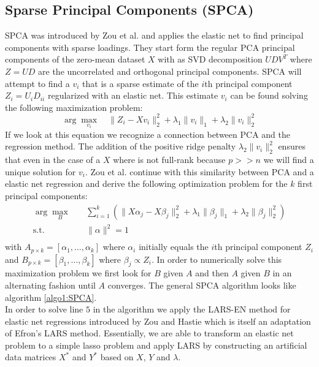 \documentclass[11pt,letterpaper]{report}
\begin{document}
\subsection*{Sparse Principal Components (SPCA)}
SPCA was introduced by Zou et al. \cite{Zou2006} and applies the elastic net to find principal components with sparse loadings. They start form the regular PCA principal components of the zero-mean dataset $X$ with as SVD decomposition $UDV^T$ where $Z=UD$ are the uncorrelated and orthogonal principal components. SPCA will attempt to find a $v_i$ that is a sparse estimate of the $i$th principal component $Z_i = U_iD_{ii}$ regularized with an elastic net. This estimate $v_i$ can be found solving the following maximization problem:
\begin{equation*}
\arg\max_{v_{i}} \quad \|Z_i - X v_i\|_2^2 + \lambda_1\|v_i\|_1 + \lambda_2\|v_i\|_2^2
\end{equation*}
If we look at this equation we recognize a connection between PCA and the regression method. The addition of the positive ridge penalty $\lambda_2\|v_i\|_2^2$ ensures that even in the case of a $X$ where is not full-rank because $p>>n$ we will find a unique solution for $v_i$. Zou et al. continue with this similarity between PCA and a elastic net regression and derive the following optimization problem for the $k$ first principal components:
\begin{equation*}
\begin{aligned}
\arg\max_{B} \quad & \sum_{i=1}^{k} \left(\|X\alpha_j-X\beta_j\|_2^2 +\lambda_1 \|\beta_j\|_1 + \lambda_2\|\beta_j\|_2^2\right)\\
\textrm{s.t.} \quad & \|\alpha\|^2 = 1\\
\end{aligned}
\end{equation*}
with $A_{p\times k} = [\alpha_1,\ldots,\alpha_k]$ where $\alpha_i$ initially equals the $i$th principal component $Z_i$ and $B_{p\times k} = [\beta_1,\ldots,\beta_k]$ where $\beta_j\propto Z_i$. In order to numerically solve this maximization problem we first look for $B$ given $A$ and then $A$ given $B$ in an alternating fashion until $A$ converges. The general SPCA algorithm looks like algorithm \ref{algo1:SPCA}.\\

In order to solve line $5$ in the algorithm we apply the LARS-EN method for elastic net regressions introduced by Zou and Hastie \cite{Zou2005} which is itself an adaptation of Efron's \citeyear{Efron2004} LARS method. Essentially, we are able to transform an elastic net problem to a simple lasso problem and apply LARS by constructing an artificial data matrices $X^*$ and $Y^*$ based on $X$, $Y$ and $\lambda$.
\end{document}
